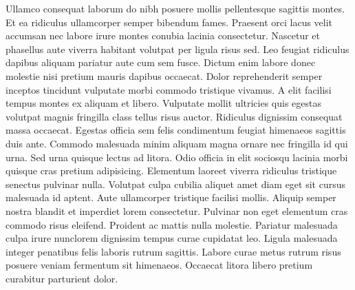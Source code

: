 Ullamco consequat laborum do nibh posuere mollis pellentesque sagittis montes. Et ea ridiculus ullamcorper semper bibendum fames. Praesent orci lacus velit accumsan nec labore irure montes conubia lacinia consectetur. Nascetur et phasellus aute viverra habitant volutpat per ligula risus sed. Leo feugiat ridiculus dapibus aliquam pariatur aute cum sem fusce. Dictum enim labore donec molestie nisi pretium mauris dapibus occaecat. Dolor reprehenderit semper inceptos tincidunt vulputate morbi commodo tristique vivamus. A elit facilisi tempus montes ex aliquam et libero.
Vulputate mollit ultricies quis egestas volutpat magnis fringilla class tellus risus auctor. Ridiculus dignissim consequat massa occaecat. Egestas officia sem felis condimentum feugiat himenaeos sagittis duis ante. Commodo malesuada minim aliquam magna ornare nec fringilla id qui urna. Sed urna quisque lectus ad litora.
Odio officia in elit sociosqu lacinia morbi quisque cras pretium adipisicing. Elementum laoreet viverra ridiculus tristique senectus pulvinar nulla. Volutpat culpa cubilia aliquet amet diam eget sit cursus malesuada id aptent. Aute ullamcorper tristique facilisi mollis. Aliquip semper nostra blandit et imperdiet lorem consectetur. Pulvinar non eget elementum cras commodo risus eleifend. Proident ac mattis nulla molestie. Pariatur malesuada culpa irure nunclorem dignissim tempus curae cupidatat leo. Ligula malesuada integer penatibus felis laboris rutrum sagittis. Labore curae metus rutrum risus posuere veniam fermentum sit himenaeos. Occaecat litora libero pretium curabitur parturient dolor.

